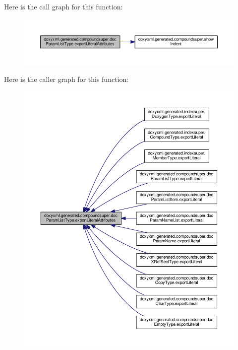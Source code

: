 Here is the call graph for this function\+:
\nopagebreak
\begin{figure}[H]
\begin{center}
\leavevmode
\includegraphics[width=350pt]{d2/d0c/classdoxyxml_1_1generated_1_1compoundsuper_1_1docParamListType_a2cd8c3cc7f94889cb2ba337ea551dcd1_cgraph}
\end{center}
\end{figure}




Here is the caller graph for this function\+:
\nopagebreak
\begin{figure}[H]
\begin{center}
\leavevmode
\includegraphics[width=350pt]{d2/d0c/classdoxyxml_1_1generated_1_1compoundsuper_1_1docParamListType_a2cd8c3cc7f94889cb2ba337ea551dcd1_icgraph}
\end{center}
\end{figure}


